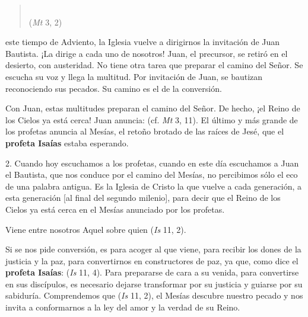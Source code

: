 \begin{body}

	\begin{quote}
		 \\(\emph{Mt} 3, 2)
	\end{quote}
	
	 este tiempo de Adviento, la Iglesia vuelve a dirigirnos la invitación de Juan Bautista. ¡La dirige a cada uno de nosotros! Juan, el precursor, se retiró en el desierto, con austeridad. No tiene otra tarea que preparar el camino del Señor. Se escucha su voz y llega la multitud. Por invitación de Juan, se bautizan reconociendo sus pecados. Su camino es el de la conversión. 
	
	Con Juan, estas multitudes preparan el camino del Señor. De hecho, ¡el Reino de los Cielos ya está cerca! Juan anuncia:  (cf. \emph{Mt} 3, 11). El último y más grande de los profetas anuncia al Mesías, el retoño brotado de las raíces de Jesé, que el \textbf{profeta Isaías} estaba esperando. 
	
	2. Cuando hoy escuchamos a los profetas, cuando en este día escuchamos a Juan el Bautista, que nos conduce por el camino del Mesías, no percibimos sólo el eco de una palabra antigua. Es la Iglesia de Cristo la que vuelve a cada generación, a esta generación {[}al final del segundo milenio{]}, para decir que el Reino de los Cielos ya está cerca en el Mesías anunciado por los profetas. 
	
	Viene entre nosotros Aquel sobre quien  (\emph{Is} 11, 2). 
	
	Si se nos pide conversión, es para acoger al que viene, para recibir los dones de la justicia y la paz, para convertirnos en constructores de paz, ya que, como dice el \textbf{profeta Isaías}:  (\emph{Is} 11, 4). Para prepararse de cara a su venida, para convertirse en sus discípulos, es necesario dejarse transformar por su justicia y guiarse por su sabiduría. Comprendemos que  (\emph{Is} 11, 2), el Mesías descubre nuestro pecado y nos invita a conformarnos a la ley del amor y la verdad de su Reino. 
	

\end{body}
